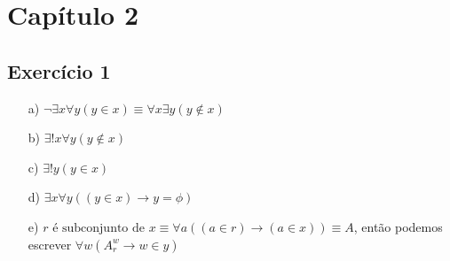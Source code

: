 \documentclass{article}
\begin{document}
\section*{Capítulo 2}

\subsection*{Exercício 1}

\begin{enumerate}
    \item[a)] $\neg \exists x \forall y (y \in x) \equiv \forall x \exists y (y \notin x)$
    \item[b)] $\exists ! x \forall y (y \notin x)$
    \item[c)] $\exists ! y (y \in x)$
    \item[d)] $\exists x \forall y ((y \in x) \rightarrow y = \phi)$
    \item[e)] $r \text{ é subconjunto de } x \equiv \forall a ((a \in r) \rightarrow (a \in x)) \equiv A$, então podemos escrever $\forall w (A_r^w \rightarrow w \in y)$
\end{enumerate}
\end{document}
